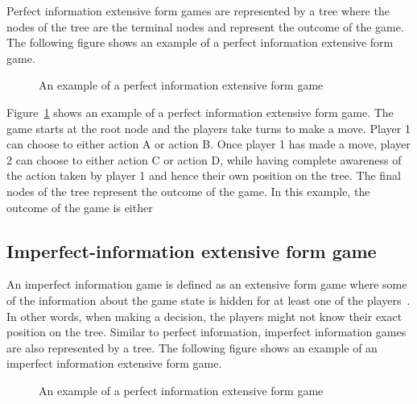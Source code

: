 Perfect information extensive form games are represented by a tree where the
nodes of the tree are the terminal nodes and represent the outcome of the
game.
The following figure shows an example of a perfect information extensive form
game.

\begin{figure}[H]
    \centering
    
    \caption{An example of a perfect information extensive form game}
    \label{fig:extensive_form_game}
\end{figure}

Figure~\ref{fig:extensive_form_game} shows an example of a perfect information
extensive form game.
The game starts at the root node and the players take turns to make a move.
Player 1 can choose to either action A or action B.
Once player 1 has made a move, player 2 can choose to either action C or action
D, while having complete awareness of the action taken by player 1 and hence
their own position on the tree.
The final nodes of the tree represent the outcome of the game.
In this example, the outcome of the game is either 

\subsection{Imperfect-information extensive form game}
\label{sec:game_imperfect_information}

An imperfect information game is defined as an extensive form game where some
of the information about the game state is hidden for at least one of the
players~\cite{Berwanger2008}.
In other words, when making a decision, the players might not know their exact
position on the tree.
Similar to perfect information, imperfect information games are also represented
by a tree.
The following figure shows an example of an imperfect information extensive
form game.

\begin{figure}[H]
    \centering
    
    \caption{An example of a perfect information extensive form game}
    \label{fig:imperfect_extensive_form_game}
\end{figure}

